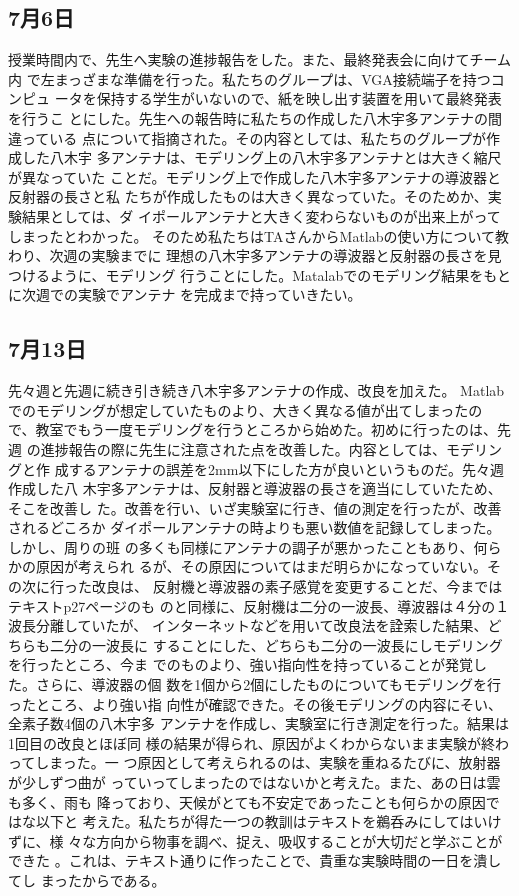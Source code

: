 \documentclass[dvipdfmx,autodetect-engine,titlepage]{jsarticle}
\begin{document}
\subsection*{7月6日}

授業時間内で、先生へ実験の進捗報告をした。また、最終発表会に向けてチーム内
で左まっざまな準備を行った。私たちのグループは、VGA接続端子を持つコンピュ
ータを保持する学生がいないので、紙を映し出す装置を用いて最終発表を行うこ
とにした。先生への報告時に私たちの作成した八木宇多アンテナの間違っている
点について指摘された。その内容としては、私たちのグループが作成した八木宇
多アンテナは、モデリング上の八木宇多アンテナとは大きく縮尺が異なっていた
ことだ。モデリング上で作成した八木宇多アンテナの導波器と反射器の長さと私
たちが作成したものは大きく異なっていた。そのためか、実験結果としては、ダ
イポールアンテナと大きく変わらないものが出来上がってしまったとわかった。
そのため私たちはTAさんからMatlabの使い方について教わり、次週の実験までに
理想の八木宇多アンテナの導波器と反射器の長さを見つけるように、モデリング
行うことにした。Matalabでのモデリング結果をもとに次週での実験でアンテナ
を完成まで持っていきたい。

\subsection*{7月13日}

先々週と先週に続き引き続き八木宇多アンテナの作成、改良を加えた。
Matlabでのモデリングが想定していたものより、大きく異なる値が出てしまったの
で、教室でもう一度モデリングを行うところから始めた。初めに行ったのは、先週
の進捗報告の際に先生に注意された点を改善した。内容としては、モデリングと作
成するアンテナの誤差を2mm以下にした方が良いというものだ。先々週作成した八
木宇多アンテナは、反射器と導波器の長さを適当にしていたため、そこを改善し
た。改善を行い、いざ実験室に行き、値の測定を行ったが、改善されるどころか
ダイポールアンテナの時よりも悪い数値を記録してしまった。しかし、周りの班
の多くも同様にアンテナの調子が悪かったこともあり、何らかの原因が考えられ
るが、その原因についてはまだ明らかになっていない。その次に行った改良は、
反射機と導波器の素子感覚を変更することだ、今まではテキストp27ページのも
のと同様に、反射機は二分の一波長、導波器は４分の１波長分離していたが、
インターネットなどを用いて改良法を詮索した結果、どちらも二分の一波長に
することにした、どちらも二分の一波長にしモデリングを行ったところ、今ま
でのものより、強い指向性を持っていることが発覚した。さらに、導波器の個
数を1個から2個にしたものについてもモデリングを行ったところ、より強い指
向性が確認できた。その後モデリングの内容にそい、全素子数4個の八木宇多
アンテナを作成し、実験室に行き測定を行った。結果は1回目の改良とほぼ同
様の結果が得られ、原因がよくわからないまま実験が終わってしまった。一
つ原因として考えられるのは、実験を重ねるたびに、放射器が少しずつ曲が
っていってしまったのではないかと考えた。また、あの日は雲も多く、雨も
降っており、天候がとても不安定であったことも何らかの原因ではな以下と
考えた。私たちが得た一つの教訓はテキストを鵜呑みにしてはいけずに、様
々な方向から物事を調べ、捉え、吸収することが大切だと学ぶことができた
。これは、テキスト通りに作ったことで、貴重な実験時間の一日を潰してし
まったからである。
\end{document}
